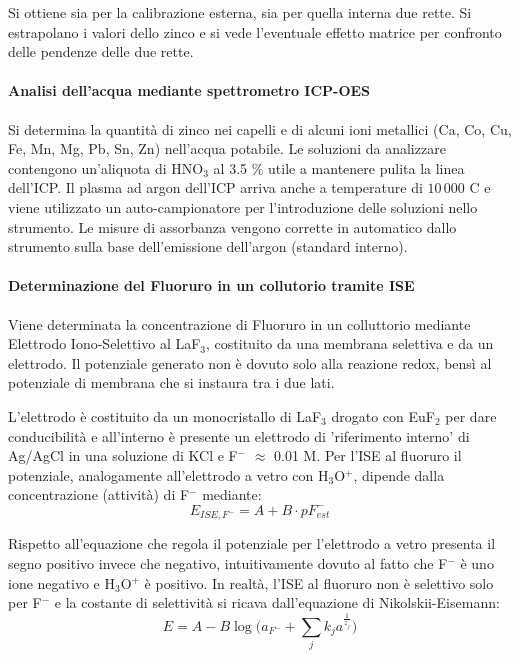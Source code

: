 Si ottiene sia per la calibrazione esterna, sia per quella interna due rette.
Si estrapolano i valori dello zinco e si vede l'eventuale effetto matrice per confronto delle pendenze delle due rette.

\paragraph{Analisi dell'acqua mediante spettrometro ICP-OES}
Si determina la quantità di zinco nei capelli e di alcuni ioni metallici (Ca, Co, Cu, Fe, Mn, Mg, Pb, Sn, Zn) nell'acqua potabile.
Le soluzioni da analizzare contengono un'aliquota di HNO$_3$ al 3.5 $\%$ utile a mantenere pulita la linea dell'ICP.
Il plasma ad argon dell'ICP arriva anche a temperature di $10\,000$ \degree C e viene utilizzato un auto-campionatore per l'introduzione delle soluzioni nello strumento.
Le misure di assorbanza vengono corrette in automatico dallo strumento sulla base dell'emissione dell'argon (standard interno).

\paragraph{Determinazione del Fluoruro in un collutorio tramite ISE}
Viene determinata la concentrazione di Fluoruro in un colluttorio mediante Elettrodo Iono-Selettivo al LaF$_3$, costituito da una membrana selettiva e da un elettrodo.
Il potenziale generato non è dovuto solo alla reazione redox, bensì al potenziale di membrana che si instaura tra i due lati.


L'elettrodo è costituito da un monocristallo di LaF$_3$ drogato con EuF$_2$ per dare conducibilità e all'interno è presente un elettrodo di 'riferimento interno' di Ag/AgCl in una soluzione di KCl e F$^-$ $\approx$ 0.01 M.
Per l'ISE al fluoruro il potenziale, analogamente all'elettrodo a vetro con H$_3$O$^+$, dipende dalla concentrazione (attività) di F$^-$ mediante:
\[
E_{ISE, F^-} = A + B \cdot pF^-_{est}
\]

Rispetto all'equazione che regola il potenziale per l'elettrodo a vetro presenta il segno positivo invece che negativo, intuitivamente dovuto al fatto che F$^-$ è uno ione negativo e H$_3$O$^+$ è positivo.
In realtà, l'ISE al fluoruro non è selettivo solo per F$^-$ e la costante di selettività si ricava dall'equazione di Nikolskii-Eisemann:
\[
E = A - B \log \biggl(a_{F^-} + \sum_j k_j a^{\frac{1}{z_j}}\biggl)
\]

